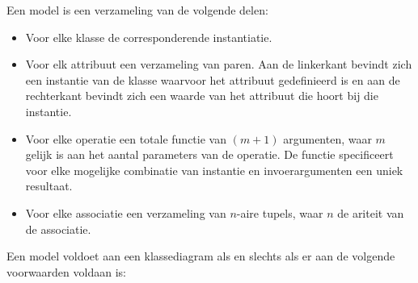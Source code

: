 Een model is een verzameling van de volgende delen:

\begin{itemize}
	\item Voor elke klasse de corresponderende instantiatie.
	\item Voor elk attribuut een verzameling van paren. Aan de linkerkant bevindt zich een instantie van de klasse waarvoor het attribuut gedefinieerd is en aan de rechterkant bevindt zich een waarde van het attribuut die hoort bij die instantie.
	\item Voor elke operatie een totale functie van $(m+1)$ argumenten, waar $m$ gelijk is aan het aantal parameters van de operatie. De functie specificeert voor elke mogelijke combinatie van instantie en invoerargumenten een uniek resultaat.
	\item Voor elke associatie een verzameling van $n$-aire tupels, waar $n$ de ariteit van de associatie.
\end{itemize}

Een model voldoet aan een klassediagram als en slechts als er aan de volgende voorwaarden voldaan is:

